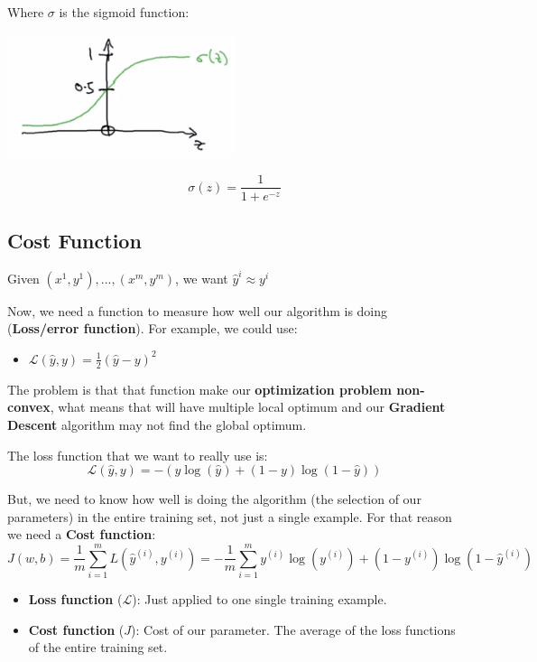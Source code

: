 \documentclass[
]{book}
\providecommand{\tightlist}{%
  \setlength{\itemsep}{0pt}\setlength{\parskip}{0pt}}
\begin{document}
Where \(\sigma\) is the sigmoid function:

\includegraphics[width=0.5\textwidth,height=\textheight]{images/sigmoid.png}

\[\sigma (z) = \frac{1}{1 + e^{-z}}\]

\hypertarget{cost-function}{%
\subsection{Cost Function}\label{cost-function}}

Given \({(x^1, y^1), ..., (x^m, y^m)}\), we want \(\hat{y}^i \approx y^i\)

Now, we need a function to measure how well our algorithm is doing (\textbf{Loss/error function}). For example, we could use:

\begin{itemize}
\tightlist
\item
  \(\mathcal{L}(\hat{y},y) = \frac{1}{2}(\hat{y}-y)^2\)
\end{itemize}

The problem is that that function make our \textbf{optimization problem non-convex}, what means that will have multiple local optimum and our \textbf{Gradient Descent} algorithm may not find the global optimum.

The loss function that we want to really use is: \[\mathcal{L}(\hat{y},y) = -(y \log (\hat{y}) + (1-y) \log(1-\hat{y}))\]

But, we need to know how well is doing the algorithm (the selection of our parameters) in the entire training set, not just a single example. For that reason we need a \textbf{Cost function}:
\[J(w,b) = \frac{1}{m} \sum^{m}_{i=1} L(\hat{y}^{(i)},y^{(i)})= -\frac{1}{m} \sum^{m}_{i=1} y^{(i)}\log (y^{(i)}) + (1 - y^{(i)}) \log (1-\hat{y}^{(i)})\]

\begin{itemize}
\tightlist
\item
  \textbf{Loss function} (\(\mathcal{L}\)): Just applied to one single training example.
\item
  \textbf{Cost function} (\(J\)): Cost of our parameter. The average of the loss functions of the entire training set.
\end{itemize}
\end{document}
